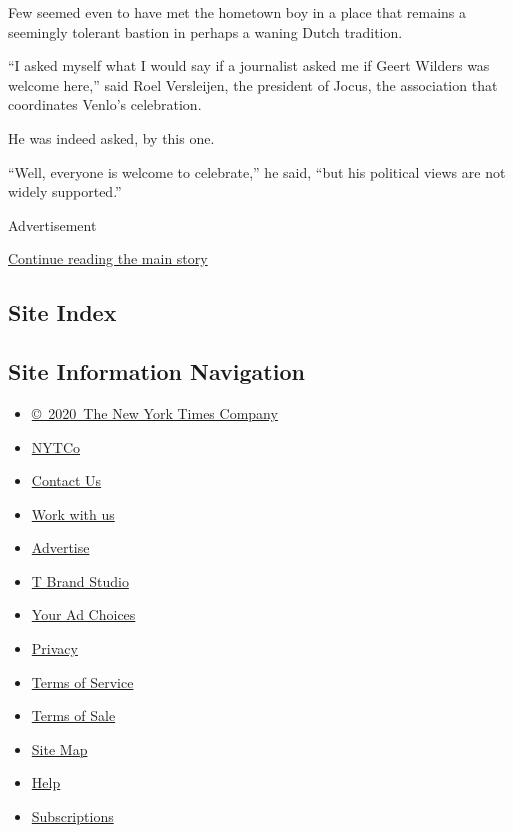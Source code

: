 Few seemed even to have met the hometown boy in a place that remains a
seemingly tolerant bastion in perhaps a waning Dutch tradition.

``I asked myself what I would say if a journalist asked me if Geert
Wilders was welcome here,'' said Roel Versleijen, the president of
Jocus, the association that coordinates Venlo's celebration.

He was indeed asked, by this one.

``Well, everyone is welcome to celebrate,'' he said, ``but his political
views are not widely supported.''

Advertisement

\protect\hyperlink{after-bottom}{Continue reading the main story}

\hypertarget{site-index}{%
\subsection{Site Index}\label{site-index}}

\hypertarget{site-information-navigation}{%
\subsection{Site Information
Navigation}\label{site-information-navigation}}

\begin{itemize}
\tightlist
\item
  \href{https://help.nytimes.com/hc/en-us/articles/115014792127-Copyright-notice}{©~2020~The
  New York Times Company}
\end{itemize}

\begin{itemize}
\tightlist
\item
  \href{https://www.nytco.com/}{NYTCo}
\item
  \href{https://help.nytimes.com/hc/en-us/articles/115015385887-Contact-Us}{Contact
  Us}
\item
  \href{https://www.nytco.com/careers/}{Work with us}
\item
  \href{https://nytmediakit.com/}{Advertise}
\item
  \href{http://www.tbrandstudio.com/}{T Brand Studio}
\item
  \href{https://www.nytimes.com/privacy/cookie-policy\#how-do-i-manage-trackers}{Your
  Ad Choices}
\item
  \href{https://www.nytimes.com/privacy}{Privacy}
\item
  \href{https://help.nytimes.com/hc/en-us/articles/115014893428-Terms-of-service}{Terms
  of Service}
\item
  \href{https://help.nytimes.com/hc/en-us/articles/115014893968-Terms-of-sale}{Terms
  of Sale}
\item
  \href{https://spiderbites.nytimes.com}{Site Map}
\item
  \href{https://help.nytimes.com/hc/en-us}{Help}
\item
  \href{https://www.nytimes.com/subscription?campaignId=37WXW}{Subscriptions}
\end{itemize}
